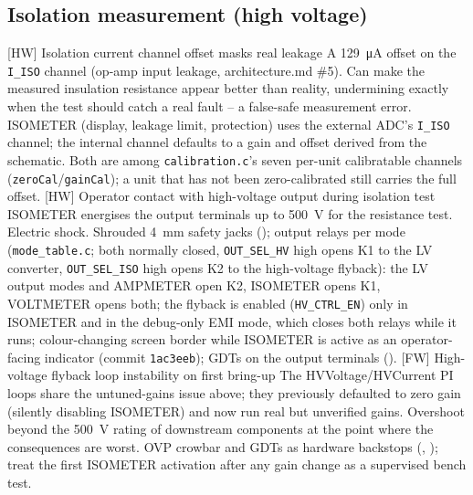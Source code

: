 \FloatBarrier

\subsection{Isolation measurement (high voltage)}

    \begin{FMEATable}
    \FMEAItemCritical
        {[HW] Isolation current channel offset masks real leakage}
        {A \qty{129}{\micro\ampere} offset on the \texttt{I\_ISO} channel (op-amp input leakage, architecture.md \#5).}
        {Can make the measured insulation resistance appear better than reality, undermining  exactly when the test should catch a real fault -- a false-safe measurement error.}
        {ISOMETER (display, leakage limit, protection) uses the external \ac{ADC}'s \texttt{I\_ISO} channel; the internal channel defaults to a gain and offset derived from the schematic. Both are among \texttt{calibration.c}'s seven per-unit calibratable channels (\texttt{zeroCal}/\texttt{gainCal}); a unit that has not been zero-calibrated still carries the full offset.}
    \FMEAItemCritical
        {[HW] Operator contact with high-voltage output during isolation test}
        {ISOMETER energises the output terminals up to \qty{500}{\volt} for the resistance test.}
        {Electric shock.}
        {Shrouded \qty{4}{\milli\meter} safety jacks (); output relays per mode (\texttt{mode\_table.c}; both normally closed, \texttt{OUT\_SEL\_HV} high opens K1 to the LV converter, \texttt{OUT\_SEL\_ISO} high opens K2 to the high-voltage flyback): the LV output modes and AMPMETER open K2, ISOMETER opens K1, VOLTMETER opens both; the flyback is enabled (\texttt{HV\_CTRL\_EN}) only in ISOMETER and in the debug-only EMI mode, which closes both relays while it runs; colour-changing screen border while ISOMETER is active as an operator-facing indicator (commit \texttt{1ac3eeb}); \ac{GDT}s on the output terminals ().}
    \FMEAItemCritical
        {[FW] High-voltage flyback loop instability on first bring-up}
        {The HVVoltage/HVCurrent PI loops share the untuned-gains issue above; they previously defaulted to zero gain (silently disabling ISOMETER) and now run real but unverified gains.}
        {Overshoot beyond the \qty{500}{\volt} rating of downstream components at the point where the consequences are worst.}
        {\ac{OVP} crowbar and \ac{GDT}s as hardware backstops (, ); treat the first ISOMETER activation after any gain change as a supervised bench test.}

\end{FMEATable}

